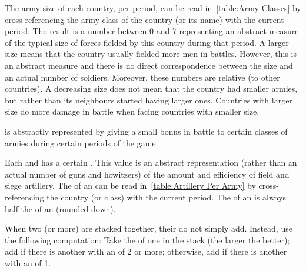 
\aparag[Size.] The army size of each country, per period, can be read
in~\ref{table:Army Classes} by cross-referencing the army class of the country
(or its name) with the current period.
\bparag The result is a number between 0 and 7 representing an abstract
measure of the typical size of forces fielded by this country during that
period.
\bparag A larger size means that the country usually fielded more men in
battles. However, this is an abstract measure and there is no direct
correspondence between the size and an actual number of soldiers. Moreover,
these numbers are relative (to other countries). A decreasing size does not
mean that the country had smaller armies, but rather than its neighbours
started having larger ones.
\bparag Countries with larger size do more damage in battle when facing
countries with smaller size.

\aparag[Cavalry] is abstractly represented by giving a small bonus in battle
to certain classes of armies during certain periods of the game.

 Each \ARMY\facemoins and \ARMY\faceplus has a
certain . This value is an abstract representation
(rather than an actual number of guns and howitzers) of the amount and
efficiency of field and siege artillery.
\bparag The  of an \ARMY\faceplus can be read
in~\ref{table:Artillery Per Army} by cross-referencing the country (or class)
with the current period.
\bparag The  of an \ARMY\facemoins is always half the
 of an \ARMY\faceplus (rounded down).


\label{chMilitary:Stacks:Artillery}
When two (or more) \ARMY are stacked together, their 
do not simply add. Instead, use the following computation:
\bparag Take the  of one \ARMY in the stack (the larger
the better); add  if there is another \ARMY with an  of 2 or more; otherwise, add  if there is another \ARMY
with an  of 1.

